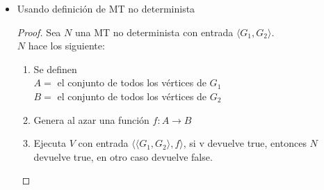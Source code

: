 \documentclass[letterpaper,10pt]{article}
\begin{document}
\begin{enumerate}
\begin{itemize}
\begin{itemize}
\begin{proof}
         		$V$ hace lo siguiente:
         		
                \begin{enumerate}[1)]
         			\item Para cada vertice $v$ en $G_1$ aplicar $f(v)$.
         			
         			\item Cada vez que se aplica $f(v)$ se reviza si los vecinos de $v$ son iguales a los vecinos de $f(v)$, si es falso que los vecinos de ambos vértices son iguales, se devuelve false, en otro caso se siguen revizando los vértices de $G_2$
         			
         			\item Al terminar de iterar sobre los vértices de $G_1$ se devuelve true.
         		
                \end{enumerate}
         		
                Como se hizo la certificación en tiempo $O(n)$, llegamos a que
                $A\in NP$. 
         	
            \end{proof}
         	
         	\newpage
         	\item Usando definición de MT no determinista
         	
            \begin{proof}
         		Sea $N$ una MT no determinista con entrada $\langle G_1,G_2 \rangle$.\\
         		
         		$N$ hace los siguiente:
         		
                \begin{enumerate}[1)]
         			\item Se definen \\
         				$A=$ el conjunto de todos los vértices de $G_1$\\
         				$B=$ el conjunto de todos los vértices de $G_2$\\
         			\item Genera al azar una función $f:A\to B$
         			
         			\item Ejecuta $V$ con entrada $\langle \langle G_1,G_2\rangle ,f\rangle$, si v devuelve true, entonces $N$ devuelve true, en otro caso devuelve false.
         		
                \end{enumerate}
         		

\end{proof}
\end{itemize}
\end{itemize}
\end{enumerate}
\end{document}
